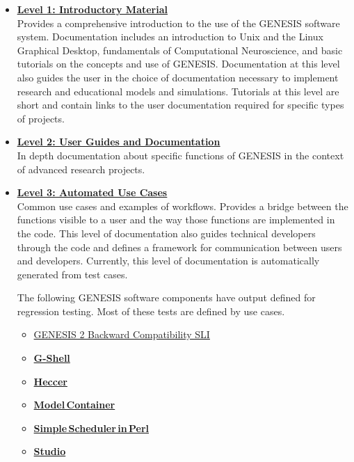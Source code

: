 \documentclass[12pt]{article}
\begin{document}
\begin{itemize}

\item[]\href{../contents-level1/contents-level1.tex}{\bf \underline{Level 1: Introductory Material}}\\
Provides a comprehensive
  introduction to the use of the GENESIS software system.
  Documentation includes an introduction to Unix and the Linux
  Graphical Desktop, fundamentals of Computational Neuroscience, and
  basic tutorials on the concepts and use of GENESIS. Documentation at
  this level also guides the user in the choice of documentation
  necessary to implement research and educational models and
  simulations.  Tutorials at this level are short and contain links to
  the user documentation required for specific types of projects.

\item[]\href{../contents-level2/contents-level2.tex}{\bf \underline{Level 2: User Guides and Documentation}}\\
 In depth
  documentation about specific functions of GENESIS in the context of
  advanced research projects.

\item[]\href{http://www.neurospaces.org/tests-menu.html}{\bf \underline{Level 3: Automated Use Cases}}\\
  Common use cases and examples
  of workflows. Provides a bridge between the functions visible to a user and
  the way those functions are implemented in the code.  This level of documentation also guides technical developers through the code and defines a
  framework for communication between users and developers.
  Currently, this level of documentation is automatically generated
  from test cases.
  
The following GENESIS software components have output defined for regression testing. Most of these tests are defined by use cases.
\begin{itemize}
\item[]\href{../tests-g2-backward-compatibility/tests-g2-backward-compatibility.tex}{GENESIS 2 Backward Compatibility SLI}
\item[]\href{../tests-gshell/tests-gshell.tex}{\bf G-Shell}
\item[]\href{../tests-heccer/tests-heccer.tex}{\bf Heccer}
\item[]\href{../tests-model-container/model-container.tex}{\bf Model\,Container}
\item[]\href{../tests-ssp/tests-ssp.tex}{\bf Simple\,Scheduler\,in\,Perl}
\item[]\href{../tests-studio/tests-studio.tex}{\bf Studio}
\end{itemize}
  

\end{itemize}
\end{document}
